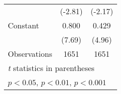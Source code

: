 \begin{table}[htbp]
\begin{tabular}{l*{2}{c}}
                                        &  (-2.81)         &  (-2.17)         \\
\addlinespace
Constant                                &    0.800\sym{***}&    0.429\sym{***}\\
                                        &   (7.69)         &   (4.96)         \\
\midrule
Observations                            &     1651         &     1651         \\
\bottomrule
\multicolumn{3}{l}{\footnotesize \textit{t} statistics in parentheses}\\
\multicolumn{3}{l}{\footnotesize \sym{*} \(p<0.05\), \sym{**} \(p<0.01\), \sym{***} \(p<0.001\)}\\
\end{tabular}
\end{table}
